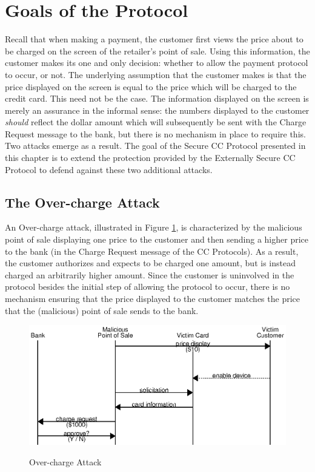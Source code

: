 \section{Goals of the Protocol}
\label{sec:secure-goals}

Recall that when making a payment, the customer first views the price about to be charged on the screen of the retailer's point of sale.
Using this information, the customer makes its one and only decision: whether to allow the payment protocol to occur, or not.
The underlying assumption that the customer makes is that the price displayed on the screen is equal to the price which will be charged to the credit card.
This need not be the case.
The information displayed on the screen is merely an assurance in the informal sense:
    the numbers displayed to the customer \emph{should} reflect the dollar amount which will subsequently be sent with the Charge Request message to the bank,
    but there is no mechanism in place to require this.
Two attacks emerge as a result.
The goal of the Secure CC Protocol presented in this chapter is to extend the protection provided by the Externally Secure CC Protocol to defend against these two additional attacks.

\subsection{The Over-charge Attack}
\label{sec:overcharge}
An Over-charge attack, illustrated in Figure \ref{fig:attack_overcharge}, is characterized by the malicious point of sale displaying one price to the customer
	and then sending a higher price to the bank
	(in the Charge Request message of the CC Protocols).
As a result, the customer authorizes and expects to be charged one amount, but is instead charged an arbitrarily higher amount.
Since the customer is uninvolved in the protocol besides the initial step of allowing the protocol to occur,
	there is no mechanism ensuring that the price displayed to the customer matches the price that the (malicious) point of sale sends to the bank.

\begin{figure}
  \caption{Over-charge Attack}
  \centering
    \includegraphics{img/attack-mr-overcharge.eps}
  \label{fig:attack_overcharge}
\end{figure}

